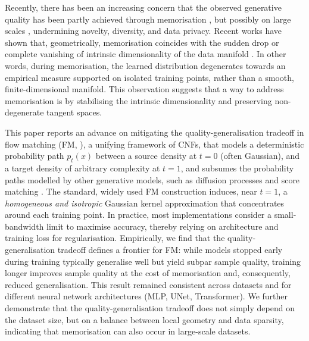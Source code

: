 \documentclass{article} %
\begin{document}
Recently, there has been an increasing concern that the observed generative quality has been partly achieved through memorisation
\citep{somepalli_diffusion_2022, Skrinjar}, but possibly on large scales \citep{Graber2025}, undermining novelty, diversity, and data privacy. Recent works have shown that, geometrically, memorisation coincides with the sudden drop or complete vanishing of intrinsic dimensionality of the data manifold \citep{achilli_losing_2024, ross2025a, ventura_manifolds_2025}. In other words, during memorisation, the learned distribution degenerates towards an empirical measure supported on isolated training points, rather than a smooth, finite-dimensional manifold.
This observation suggests that a way to address memorisation is by stabilising the intrinsic dimensionality and preserving non-degenerate tangent spaces.

This paper reports an advance on mitigating the quality-generalisation tradeoff in flow matching (FM, \cite{lipman2023flow}), a unifying framework of CNFs, that models a deterministic probability path $p_t(x)$ between a source density at $t=0$ (often Gaussian), and a target density of arbitrary complexity at $t=1$, and subsumes the probability paths modelled by other generative models, such as diffusion processes and score matching \citep{lipman2023flow}. 
The standard, widely used FM construction induces, near $t=1$, a \textit{homogeneous and isotropic} Gaussian kernel approximation that concentrates around each training point. 
In practice, most implementations consider a small-bandwidth limit to maximise accuracy, thereby relying on architecture and training loss for regularisation. 
Empirically, we find that the quality-generalisation tradeoff defines a frontier for FM: while models stopped early during training typically generalise well but yield subpar sample quality, training longer improves sample quality at the cost of memorisation and, consequently, reduced generalisation. 
This result remained consistent across datasets and for different neural network architectures (MLP, UNet, Transformer).
We further demonstrate that the quality-generalisation tradeoff does not simply depend on the dataset size, but on a balance between local geometry and data sparsity, indicating that memorisation can also occur in large-scale datasets.
\end{document}
